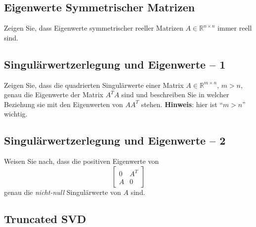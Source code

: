 \documentclass[
]{book}
\theoremstyle{definition}
\theoremstyle{definition}
\theoremstyle{definition}
\theoremstyle{definition}
\theoremstyle{remark}
\begin{document}
\hypertarget{eigenwerte-symmetrischer-matrizen}{%
\subsection{Eigenwerte Symmetrischer Matrizen}\label{eigenwerte-symmetrischer-matrizen}}

Zeigen Sie, dass Eigenwerte symmetrischer reeller Matrizen \(A\in \mathbb R^{n\times n}\) immer reell sind.

\hypertarget{singuluxe4rwertzerlegung-und-eigenwerte-1}{%
\subsection{Singulärwertzerlegung und Eigenwerte -- 1}\label{singuluxe4rwertzerlegung-und-eigenwerte-1}}

Zeigen Sie, dass die quadrierten Singulärwerte einer Matrix \(A\in \mathbb R^{m\times n}\), \(m>n\), genau die Eigenwerte der Matrix \(A^TA\) sind und beschreiben Sie in welcher Beziehung sie mit den Eigenwerten von \(AA^T\) stehen. \textbf{Hinweis}: hier ist ``\(m>n\)'' wichtig.

\hypertarget{singuluxe4rwertzerlegung-und-eigenwerte-2}{%
\subsection{Singulärwertzerlegung und Eigenwerte -- 2}\label{singuluxe4rwertzerlegung-und-eigenwerte-2}}

Weisen Sie nach, dass die positiven Eigenwerte von
\begin{equation*}
\begin{bmatrix}
0 & A^T \\ A & 0
\end{bmatrix}
\end{equation*}
genau die \emph{nicht-null} Singulärwerte von \(A\) sind.

\hypertarget{truncated-svd}{%
\subsection{Truncated SVD}\label{truncated-svd}}
\end{document}

